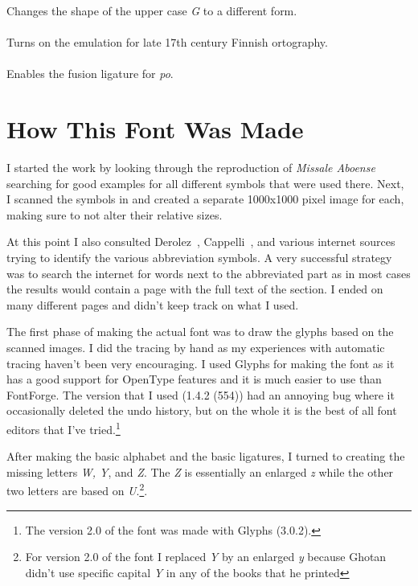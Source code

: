 \documentclass[a4paper, 12pt]{article}
\begin{document}
Changes the shape of the upper case \emph{G} to a different form.

\paragraph{}

Turns on the emulation for late 17th century Finnish ortography.

\paragraph{}

Enables the {\MsPoFusionStyle {}} fusion ligature for
\emph{po}. 



\label{pg:latex_end}

\section{How This Font Was Made}

I started the work by looking through the reproduction of
\emph{Missale Aboense} searching for good examples for all different
symbols that were used there. Next, I scanned the symbols in and
created a separate 1000x1000 pixel image for each, making sure to not
alter their relative sizes.

At this point I also consulted Derolez~\cite{derolez},
Cappelli~\cite{cappelli}, and various internet sources trying to
identify the various abbreviation symbols. A very successful strategy
was to search the internet for words next to the abbreviated part as
in most cases the results would contain a page with the full text of
the section. I ended on many different pages and didn't keep track on
what I used.

The first phase of making the actual font was to draw the glyphs based
on the scanned images. I did the tracing by hand as my experiences
with automatic tracing haven't been very encouraging. I used Glyphs
for making the font as it has a good support for OpenType features and
it is much easier to use than FontForge. The version that I used
(1.4.2 (554)) had an annoying bug where it occasionally deleted the
undo history, but on the whole it is the best of all font editors that
I've tried.\footnote{The version 2.0 of the font was made with Glyphs (3.0.2).}

After making the basic alphabet and the basic ligatures, I turned to
creating the missing letters \emph{W, Y}, and \emph{Z}. The \emph{Z}
is essentially an enlarged \emph{z} while the other two letters are
based on \emph{U}.\footnote{For version 2.0 of the font I replaced
  \emph{Y} by an enlarged \emph{y} because Ghotan didn't use specific
  capital \emph{Y} in any of the books that he printed}. 
\end{document}
